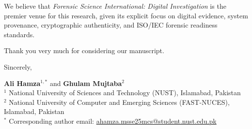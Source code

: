 \documentclass[11pt,a4paper]{article}
\begin{document}
We believe that \textit{Forensic Science International: Digital Investigation} is the premier venue for this research, given its explicit focus on digital evidence, system provenance, cryptographic authenticity, and ISO/IEC forensic readiness standards.

Thank you very much for considering our manuscript.

\vspace{1em}
Sincerely,

\textbf{Ali Hamza}$^{1,*}$ and \textbf{Ghulam Mujtaba}$^2$ \\
$^1$ National University of Sciences and Technology (NUST), Islamabad, Pakistan \\
$^2$ National University of Computer and Emerging Sciences (FAST-NUCES), Islamabad, Pakistan \\
$^*$ Corresponding author email: \href{mailto:ahamza.msse25mcs@student.nust.edu.pk}{ahamza.msse25mcs@student.nust.edu.pk}
\end{document}
